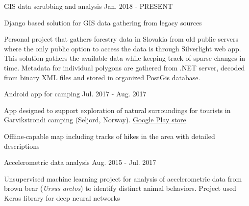 
\begin{cventries}
  \cventry
    {} %
    {GIS data scrubbing and analysis} %
    {} %
    {Jan. 2018 - PRESENT} %
    {
      \begin{cvitems} %
        \item {Django based solution for GIS data gathering from legacy sources}
		\item {Personal project that gathers forestry data in Slovakia from old public servers where the only public option to access the data is through Silverlight web app. This solution gathers the available data while keeping track of sparse changes in time. Metadata for individual polygons are gathered from .NET server, decoded from binary XML files and stored in organized PostGis database.}
      \end{cvitems}
    }

  \cventry
    {} %
    {Android app for camping} %
    {} %
    {Jul. 2017 - Aug. 2017} %
    {
      \begin{cvitems} %
      	\item {App designed to support exploration of natural surroundings for tourists in Garvikstrondi camping (Seljord, Norway). \underline{\href{https://play.google.com/store/apps/details?id=sk.malobysa.www.garvikstronditur&hl=en}{Google Play store}}}
      	\item {Offline-capable map including tracks of hikes in the area with detailed descriptions}
      \end{cvitems}
    }

  \cventry
    {} %
    {Accelerometric data analysis} %
    {} %
    {Aug. 2015 - Jul. 2017} %
    {
      \begin{cvitems} %
      	\item {Unsupervised machine learning project for analysis of accelerometric data from brown bear (\textit{Ursus arctos}) to identify distinct animal behaviors. Project used Keras library for deep neural networks}
      \end{cvitems}
    }
\end{cventries}
